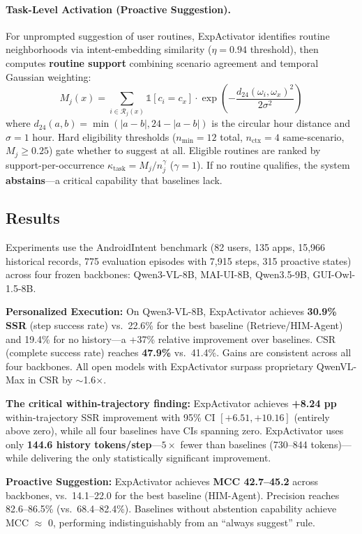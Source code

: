 \documentclass[11pt,a4paper]{article}
\begin{document}
\paragraph{Task-Level Activation (Proactive Suggestion).}
For unprompted suggestion of user routines, ExpActivator identifies routine neighborhoods via intent-embedding similarity ($\eta{=}0.94$ threshold), then computes \textbf{routine support} combining scenario agreement and temporal Gaussian weighting:
\begin{equation}
M_j(x) = \sum_{i \in \mathcal{R}_j(x)} \mathbb{1}[c_i = c_x] \cdot \exp\!\left(-\frac{d_{24}(\omega_i, \omega_x)^2}{2\sigma^2}\right)
\end{equation}
where $d_{24}(a,b) = \min(|a{-}b|, 24{-}|a{-}b|)$ is the circular hour distance and $\sigma{=}1$ hour. Hard eligibility thresholds ($n_{\min}{=}12$ total, $n_{\text{ctx}}{=}4$ same-scenario, $M_j \geq 0.25$) gate whether to suggest at all. Eligible routines are ranked by support-per-occurrence $\kappa_{\text{task}} = M_j / n_j^\gamma$ ($\gamma{=}1$). If no routine qualifies, the system \textbf{abstains}---a critical capability that baselines lack.

\subsection{Results}
Experiments use the AndroidIntent benchmark (82 users, 135 apps, 15,966 historical records, 775 evaluation episodes with 7,915 steps, 315 proactive states) across four frozen backbones: Qwen3-VL-8B, MAI-UI-8B, Qwen3.5-9B, GUI-Owl-1.5-8B.

\textbf{Personalized Execution:} On Qwen3-VL-8B, ExpActivator achieves \textbf{30.9\% SSR} (step success rate) vs.\ 22.6\% for the best baseline (Retrieve/HIM-Agent) and 19.4\% for no history---a +37\% relative improvement over baselines. CSR (complete success rate) reaches \textbf{47.9\%} vs.\ 41.4\%. Gains are consistent across all four backbones. All open models with ExpActivator surpass proprietary QwenVL-Max in CSR by $\sim$1.6$\times$.

\textbf{The critical within-trajectory finding:} ExpActivator achieves \textbf{+8.24 pp} within-trajectory SSR improvement with 95\% CI $[+6.51, +10.16]$ (entirely above zero), while all four baselines have CIs spanning zero. ExpActivator uses only \textbf{144.6 history tokens/step}---$5\times$ fewer than baselines (730--844 tokens)---while delivering the only statistically significant improvement.

\textbf{Proactive Suggestion:} ExpActivator achieves \textbf{MCC 42.7--45.2} across backbones, vs.\ 14.1--22.0 for the best baseline (HIM-Agent). Precision reaches 82.6--86.5\% (vs.\ 68.4--82.4\%). Baselines without abstention capability achieve MCC $\approx$ 0, performing indistinguishably from an ``always suggest'' rule.
\end{document}
